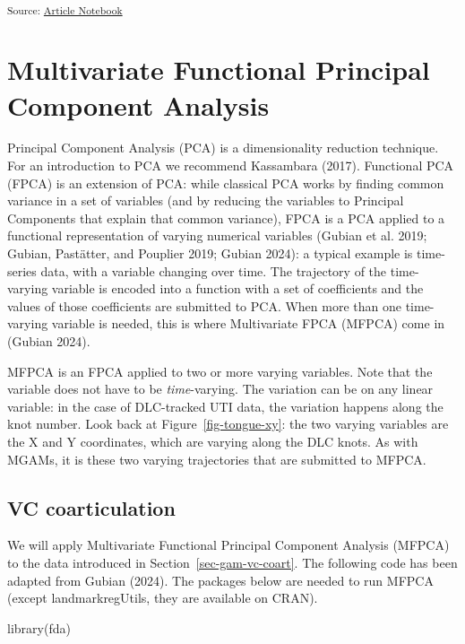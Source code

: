 \documentclass[
]{interact}
\newenvironment{Shaded}{\begin{snugshade}}{\end{snugshade}}
\newcommand{\FunctionTok}[1]{\textcolor[rgb]{0.28,0.35,0.67}{#1}}
\newcommand{\NormalTok}[1]{\textcolor[rgb]{0.00,0.23,0.31}{#1}}
\begin{document}
\textsubscript{Source:
\href{https://stefanocoretta.github.io/mv_uti/index.qmd.html}{Article
Notebook}}

\section{Multivariate Functional Principal Component
Analysis}\label{sec-fpca}

Principal Component Analysis (PCA) is a dimensionality reduction
technique. For an introduction to PCA we recommend Kassambara (2017).
Functional PCA (FPCA) is an extension of PCA: while classical PCA works
by finding common variance in a set of variables (and by reducing the
variables to Principal Components that explain that common variance),
FPCA is a PCA applied to a functional representation of varying
numerical variables (Gubian et al. 2019; Gubian, Pastätter, and Pouplier
2019; Gubian 2024): a typical example is time-series data, with a
variable changing over time. The trajectory of the time-varying variable
is encoded into a function with a set of coefficients and the values of
those coefficients are submitted to PCA. When more than one time-varying
variable is needed, this is where Multivariate FPCA (MFPCA) come in
(Gubian 2024).

MFPCA is an FPCA applied to two or more varying variables. Note that the
variable does not have to be \emph{time}-varying. The variation can be
on any linear variable: in the case of DLC-tracked UTI data, the
variation happens along the knot number. Look back at
Figure~\ref{fig-tongue-xy}: the two varying variables are the X and Y
coordinates, which are varying along the DLC knots. As with MGAMs, it is
these two varying trajectories that are submitted to MFPCA.

\subsection{VC coarticulation}\label{sec-fpca-vc}

We will apply Multivariate Functional Principal Component Analysis
(MFPCA) to the data introduced in Section~\ref{sec-gam-vc-coart}. The
following code has been adapted from Gubian (2024). The packages below
are needed to run MFPCA (except landmarkregUtils, they are available on
CRAN).

\begin{Shaded}
\begin{Highlighting}[]
\FunctionTok{library}\NormalTok{(fda)}
\end{Highlighting}
\end{Shaded}
\end{document}
